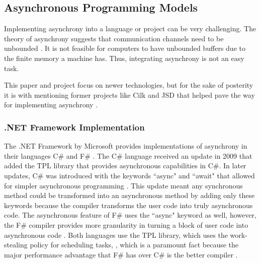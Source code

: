 \subsection{Asynchronous Programming Models}

Implementing asynchrony into a language or project can be very challenging. The theory of asynchrony suggests that communication channels need to be unbounded \cite{He1990}. It is not feasible for computers to have unbounded buffers due to the finite memory a machine has. Thus, integrating asynchrony is not an easy task.

This paper and project focus on newer technologies, but for the sake of posterity it is with mentioning former projects like Cilk and JSD that helped pave the way for implementing asynchrony \cite{sutcliffe1988jackson}\cite{Cameron1986}\cite{Frigo1998}.

\subsubsection{.NET Framework Implementation}

The .NET Framework by Microsoft provides implementations of asynchrony in their languages C\# and F\# \cite{syme2011f}\cite{Leijen2009}. The C\# language received an update in 2009 that added the TPL library that provides asynchronous capabilities in C\#. In later updates, C\# was introduced with the keywords ``async" and ``await" that allowed for simpler asynchronous programming \cite{alexdavies2012}. This update meant any synchronous method could be transformed into an asynchronous method by adding only these keywords because the compiler transforms the user code into truly asynchronous code. The asynchronous feature of F\# uses the ``async" keyword as well, however, the F\# compiler provides more granularity in turning a block of user code into asynchronous code \cite{syme2011f}. Both languages use the TPL library, which uses the work-stealing policy for scheduling tasks, \cite{Leijen2009}\cite{msftVFS}, which is a paramount fact because the major performance advantage that F\# has over C\# is the better compiler \cite{syme2011f}.
